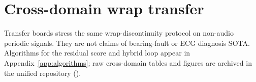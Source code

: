 \section{Cross-domain wrap transfer}
\label{app:transfer-bundle}

Transfer boards stress the same wrap-discontinuity protocol on non-audio periodic signals.
They are not claims of bearing-fault or ECG diagnosis SOTA.
Algorithms for the residual score and hybrid loop appear in Appendix~\ref{app:algorithms}; raw cross-domain tables and figures are archived in the unified repository ().



